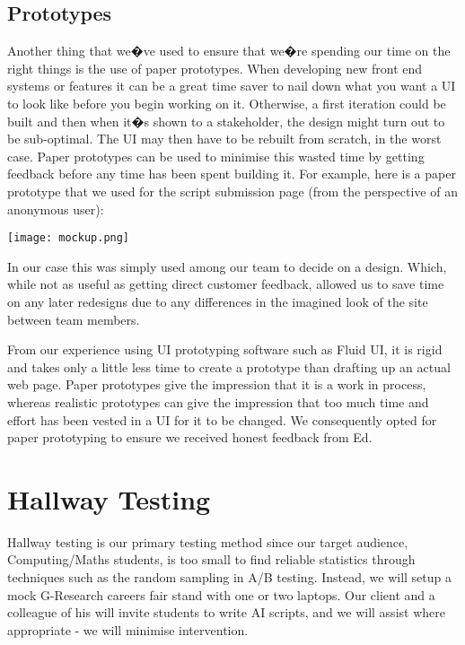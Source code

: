 \subsection{Prototypes}
Another thing that we�ve used to ensure that we�re spending our time on the right things is the use of paper prototypes. When developing new front end systems or features it can be a great time saver to nail down what you want a UI to look like before you begin working on it. Otherwise, a first iteration could be built and then when it�s shown to a stakeholder, the design might turn out to be sub-optimal. The UI may then have to be rebuilt from scratch, in the worst case. Paper prototypes can be used to minimise this wasted time by getting feedback before any time has been spent building it. For example, here is a paper prototype that we used for the script submission page (from the perspective of an anonymous user):

\begin{center}
\texttt{[image: mockup.png]}
\end{center}

In our case this was simply used among our team to decide on a design. Which, while not as useful as getting direct customer feedback, allowed us to save time on any later redesigns due to any differences in the imagined look of the site between team members. 

From our experience using UI prototyping software such as Fluid UI, it is rigid and takes only a little less time to create a prototype than drafting up an actual web page. Paper prototypes give the impression that it is a work in process, whereas realistic prototypes can give the impression that too much time and effort has been vested in a UI for it to be changed. We consequently opted for paper prototyping to ensure we received honest feedback from Ed.

\section{Hallway Testing}
Hallway testing is our primary testing method since our target audience, Computing/Maths students, is too small to find reliable statistics through techniques such as the random sampling in A/B testing. Instead, we will setup a mock G-Research careers fair stand with one or two laptops. Our client and a colleague of his will invite students to write AI scripts, and we will assist where appropriate - we will minimise intervention.

